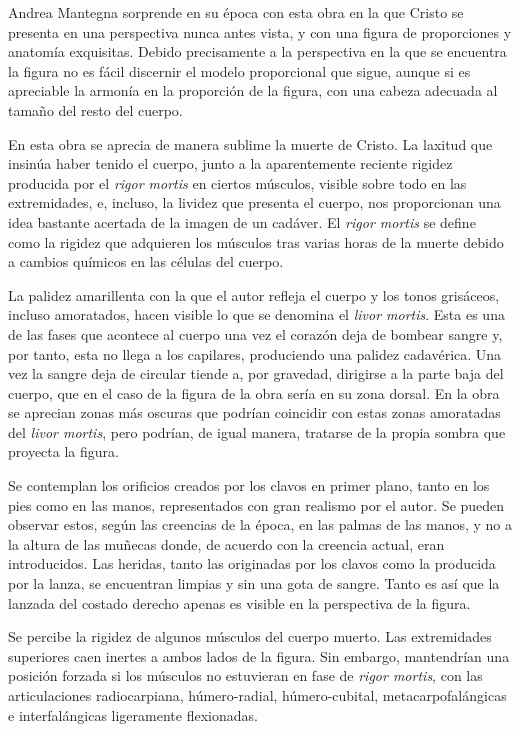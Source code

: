 Andrea Mantegna sorprende en su época con esta obra en la que Cristo se presenta en una perspectiva nunca antes vista, y con una figura de proporciones y anatomía exquisitas. Debido precisamente a la perspectiva en la que se encuentra la figura no es fácil discernir el modelo proporcional que sigue, aunque si es apreciable la armonía en la proporción de la figura, con una cabeza adecuada al tamaño del resto del cuerpo.

En esta obra se aprecia de manera sublime la muerte de Cristo. La laxitud que insinúa haber tenido el cuerpo, junto a la aparentemente reciente rigidez producida por el \textit{rigor mortis} en ciertos músculos, visible sobre todo en las extremidades, e, incluso, la lividez que presenta el cuerpo, nos proporcionan una idea bastante acertada de la imagen de un cadáver. El \textit{rigor mortis} se define como la rigidez que adquieren los músculos tras varias horas de la muerte debido a cambios químicos en las células del cuerpo.

La palidez amarillenta con la que el autor refleja el cuerpo y los tonos grisáceos, incluso amoratados, hacen visible lo que se denomina el \textit{livor mortis}. Esta es una de las fases que acontece al cuerpo una vez el corazón deja de bombear sangre y, por tanto, esta no llega a los capilares, produciendo una palidez cadavérica. Una vez la sangre deja de circular tiende a, por gravedad, dirigirse a la parte baja del cuerpo, que en el caso de la figura de la obra sería en su zona dorsal. En la obra se aprecian zonas más oscuras que podrían coincidir con estas zonas amoratadas del \textit{livor mortis}, pero podrían, de igual manera, tratarse de la propia sombra que proyecta la figura.

Se contemplan los orificios creados por los clavos en primer plano, tanto en los pies como en las manos, representados con gran realismo por el autor. Se pueden observar estos, según las creencias de la época, en las palmas de las manos, y no a la altura de las muñecas donde, de acuerdo con la creencia actual, eran introducidos.
Las heridas, tanto las originadas por los clavos como la producida por la lanza, se encuentran limpias y sin una gota de sangre. Tanto es así que la lanzada del costado derecho apenas es visible en la perspectiva de la figura. 

Se percibe la rigidez de algunos músculos del cuerpo muerto. Las extremidades superiores caen inertes a ambos lados de la figura. Sin embargo, mantendrían una posición forzada si los músculos no estuvieran en fase de \textit{rigor mortis}, con las articulaciones radiocarpiana, húmero-radial, húmero-cubital, metacarpofalángicas e interfalángicas  ligeramente flexionadas.

